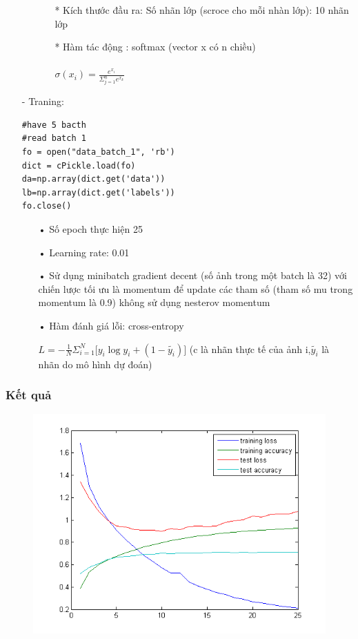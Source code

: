 \documentclass[a4paper,12pt]{report}
\begin{document}
\begin{itemize}
\begin{itemize}
\begin{itemize}
\item[*] Kích thước đầu ra: Số nhãn lớp (scroce cho mỗi nhàn lớp): 10 nhãn lớp
\item[*] Hàm tác động : softmax (vector x có n chiều) \\ \\ 
\hspace*{2cm} $\sigma(x_i) = \frac{e^{x_i}}{\Sigma_{j=1}^{n}e^{x_k}}$
\end{itemize}
\end{itemize}
\item[-] Traning:
\begin{lstlisting}
#have 5 bacth 
#read batch 1
fo = open("data_batch_1", 'rb')
dict = cPickle.load(fo)
da=np.array(dict.get('data'))
lb=np.array(dict.get('labels'))
fo.close()
\end{lstlisting}
\begin{itemize}
\item[•] Số epoch thực hiện 25
\item[•] Learning rate: 0.01
\item[•] Sử dụng minibatch gradient decent (số ảnh trong một batch là 32) với chiến lược tối ưu là momentum để update các tham số (tham số mu trong momentum là 0.9) không sử dụng nesterov momentum
\item[•] Hàm đánh giá lỗi: cross-entropy \\
\begin{center}
$L = -\frac{1}{N}\Sigma_{i=1}^{N}\big[y_i\log y_i + (1-\tilde{y_i})\big]$ (c là nhãn thực tế của ảnh i,$\tilde{y_i}$ là nhãn do mô hình dự đoán)
\end{center}
\end{itemize}
\end{itemize}
\subsubsection{Kết quả}
\begin{figure}[h]
\begin{center}
\includegraphics[width =1.0 \textwidth]{testImg.png}
\end{center}
\end{figure}
\end{document}
